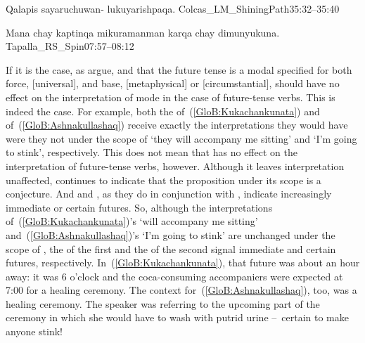 %
{Qalapis sayaruchuwan- lukuyarishpaqa.}%
{}%
{Colcas\_LM\_ShiningPath}{35:32--35:40}%

%
{Mana chay kaptinqa mikuramanman karqa chay dimunyukuna.}%
{}%
{Tapalla\_RS\_Spin}{07:57--08:12}%

If it is the case, as \citet{Copley09} argue, and \citet{Matthewson05} that the future tense is a modal specified for both force, [universal], and base, [metaphysical] or [circumstantial],  should have no effect on the interpretation of mode in the case of future-tense verbs. This is indeed the case. For example, both the  of~(\ref{GloB:Kukachankunata}) and  of~(\ref{GloB:Ashnakullashaq}) receive exactly the interpretations they would have were they not under the scope of  ‘they will accompany me sitting’ and ‘I’m going to stink’, respectively. This does not mean that  has no effect on the interpretation of future-tense verbs, however. Although it leaves  interpretation unaffected,  continues to indicate that the proposition under its scope is a conjecture. And  and , as they do in conjunction with , indicate increasingly immediate or certain futures. So, although the  interpretations of~(\ref{GloB:Kukachankunata})’s  ‘will accompany me sitting’ and~(\ref{GloB:Ashnakullashaq})’s  ‘I’m going to stink’ are unchanged under the scope of , the  of the first and the  of the second signal immediate and certain futures, respectively. In~(\ref{GloB:Kukachankunata}), that future was about an hour away: it was 6 o’clock and the coca-consuming accompaniers were expected at 7:00 for a healing ceremony. The context for~(\ref{GloB:Ashnakullashaq}), too, was a healing ceremony. The speaker was referring to the upcoming part of the ceremony in which she would have to wash with putrid urine --~certain to make anyone stink!\\

